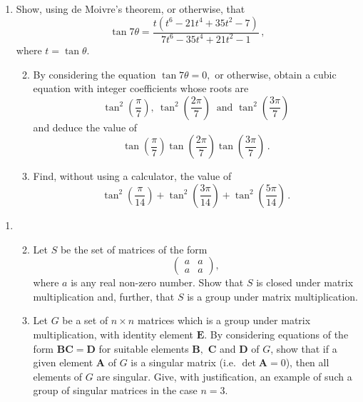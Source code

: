\documentclass[a4, 11pt]{report}
\newlength{\qspace}
\newcounter{qnumber}
\newenvironment{question}%
 {\vspace{\qspace}
  \begin{enumerate}[\bfseries 1\quad][10]%
    \setcounter{enumi}{\value{qnumber}}%
    \item%
 }
{
  \end{enumerate}
  \filbreak
  \stepcounter{qnumber}
 }
\newenvironment{questionparts}[1][1]%
 {
  \begin{enumerate}[\bfseries (i)]%
    \setcounter{enumii}{#1}
    \addtocounter{enumii}{-1}
    \setlength{\itemsep}{5mm}
    \setlength{\parskip}{8pt}
 }
 {
  \end{enumerate}
 }
\begin{document}
\begin{question}
Show, using de Moivre's theorem, or otherwise, that 
\[
\tan7\theta=\frac{t(t^{6}-21t^{4}+35t^{2}-7)}{7t^{6}-35t^{4}+21t^{2}-1}\,,
\]
where $t=\tan\theta.$

\begin{questionparts}
\item By considering the equation $\tan7\theta=0,$ or otherwise, obtain
a cubic equation with integer coefficients whose roots are 
\[
\tan^{2}\left(\frac{\pi}{7}\right),\ \tan^{2}\left(\frac{2\pi}{7}\right)\ \mbox{ and }\tan^{2}\left(\frac{3\pi}{7}\right)
\]
and deduce the value of 
\[
\tan\left(\frac{\pi}{7}\right)\tan\left(\frac{2\pi}{7}\right)\tan\left(\frac{3\pi}{7}\right)\,.
\]

\item Find, without using a calculator, the value of 
\[
\tan^{2}\left(\frac{\pi}{14}\right)+\tan^{2}\left(\frac{3\pi}{14}\right)+\tan^{2}\left(\frac{5\pi}{14}\right)\,.
\]

\end{questionparts}
	\end{question}
	
\begin{question}
\begin{questionparts}  \item Let $S$ be the set of matrices of the form
\[
\begin{pmatrix}a & a\\
a & a
\end{pmatrix},
\]
where $a$ is any real non-zero number. Show that $S$ is closed under
matrix multiplication and, further, that $S$ is a group under matrix
multiplication. 


\item Let $G$ be a set of $n\times n$ matrices which is a group
under matrix multiplication, with identity element $\mathbf{E}.$
By considering equations of the form $\mathbf{BC=D}$ for suitable
elements $\mathbf{B},$ $\mathbf{C}$ and $\mathbf{D}$ of $G$, show
that if a given element $\mathbf{A}$ of $G$ is a singular matrix
(i.e. $\det\mathbf{A}=0$), then all elements of $G$ are singular.
Give, with justification, an example of such a group of singular matrices
in the case $n=3.$ \end{questionparts}


\end{question}
	
\end{document}

